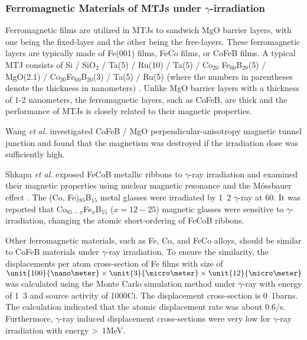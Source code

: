 \documentclass[molecules,review,submit,pdftex,moreauthors]{Definitions/mdpi}
\begin{document}
\subsubsection{Ferromagnetic Materials of MTJs under $\gamma$-irradiation}


Ferromagnetic films are utilized in MTJs to sandwich  MgO barrier layers, with one being the fixed-layer and the other being the free-layers.  These ferromagnetic layers are typically made of Fe(001) films, FeCo films, or CoFeB films.  A typical MTJ consists of Si / SiO$_2$ / Ta(5) / Ru(10) / Ta(5) / Co$_{20}$ Fe$_{60}$B$_{20}$(5) /  MgO(2.1) / Co$_{20}$Fe$_{60}$B$_{20}$(3) / Ta(5) / Ru(5) (where the numbers in parentheses denote the thickness in nanometers) \cite{Wang2016NL}.  Unlike MgO barrier layers with a thickness of 1-2 nanometers, the ferromagnetic layers, such as CoFeB, are thick and the performance of MTJs is closely related to their magnetic properties.


Wang \textit{et al.} \cite{Wang2019IEEE} investigated CoFeB / MgO perpendicular-anisotropy magnetic tunnel junction and found that the magnetism was destroyed if the irradiation dose was sufficiently high.


Shkapa \textit{et al.} exposed FeCoB metallic ribbons to $\gamma$-ray irradiation and examined their magnetic properties using nuclear magnetic resonance and the M\'{o}ssbauer effect \cite{Shkapa1993JNCS}.  The (Co, Fe)$_{85}$B$_{15}$ metal glasses were irradiated by \unit{1.2}{\mega\electronvolt} $\gamma$-ray at \unit{60}{\celsius}.  It was reported that Co$_{85 - x}$Fe$_x$B$_{15}$ ($x = 12 - 25$) magnetic glasses were sensitive to $\gamma$-irradiation, changing the atomic short-ordering of FeCoB ribbons.  


Other ferromagnetic materials, such as Fe, Co, and FeCo alloys, should be similar to CoFeB materials under $\gamma$-ray irradiation.  To ensure the similarity, the displacements per atom cross-section of Fe films with size of $\unit{100}{\nano\meter} \times \unit{3}{\micro\meter} \times \unit{12}{\micro\meter}$ was calculated using the Monte Carlo simulation method \cite{Pinera2014NIMPRb} under  $\gamma$-ray with energy of \unit{1.3}{\mega\electronvolt} and source activity of \unit{1000}{Ci}.  The displacement cross-section is \unit{0.1}{barns}.  The calculation indicated that the atomic displacement rate was about 0.6/s.  Furthermore, $\gamma$-ray induced displacement cross-sections were very low for $\gamma$-ray irradiation with energy \unit{> 1}{MeV}.
\end{document}
